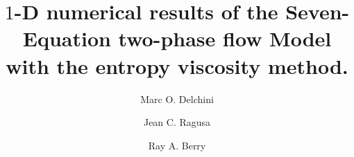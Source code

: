 \documentclass[preprint,10pt]{elsarticle}
\begin{document}
\begin{frontmatter}


\title{$1$-D numerical results of the Seven-Equation two-phase flow Model with the entropy viscosity method.}
\author{Marc O. Delchini}

\author{Jean C. Ragusa}

\author{Ray A. Berry}

\address[label1]{Department of Nuclear Engineering, Texas A\&M University, College Station, TX 77843, USA }

\address[label2]{Idaho National Laboratory, Idaho Falls, ID 83415, USA }


\end{frontmatter}
\end{document}
